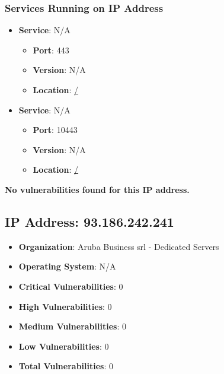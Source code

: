 \documentclass{article}
\begin{document}
\subsubsection*{Services Running on IP Address}

\begin{itemize}
    
        \item \textbf{Service}: N/A
        \begin{itemize}
            \item \textbf{Port}: 443
            \item \textbf{Version}:  N/A 
            \item \textbf{Location}: \href{ / }{ / }
        \end{itemize}
    
        \item \textbf{Service}: N/A
        \begin{itemize}
            \item \textbf{Port}: 10443
            \item \textbf{Version}:  N/A 
            \item \textbf{Location}: \href{ / }{ / }
        \end{itemize}
    
\end{itemize}


\textbf{No vulnerabilities found for this IP address.}




\clearpage



\subsection*{IP Address: 93.186.242.241}

\begin{itemize}
    \item \textbf{Organization}: Aruba Business srl - Dedicated Servers
    \item \textbf{Operating System}:  N/A 
    \item \textbf{Critical Vulnerabilities}: 0
    \item \textbf{High Vulnerabilities}: 0
    \item \textbf{Medium Vulnerabilities}: 0
    \item \textbf{Low Vulnerabilities}: 0
    \item \textbf{Total Vulnerabilities}: 0
\end{itemize}
\end{document}
